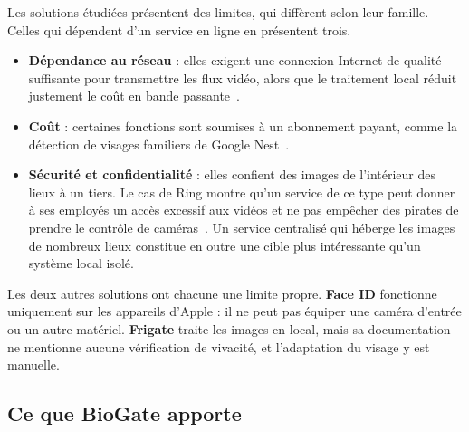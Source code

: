 \begin{maj}
Les solutions étudiées présentent des limites, qui diffèrent selon leur famille. Celles qui dépendent d'un service en ligne en présentent trois.
\end{maj}
\begin{itemize}
  \item \textbf{Dépendance au réseau} : elles exigent une connexion Internet de qualité suffisante pour transmettre les flux vidéo, alors que le traitement local réduit justement le coût en bande passante~\cite{shi2016edge}.
  \item \textbf{Coût} : certaines fonctions sont soumises à un abonnement payant, comme la détection de visages familiers de Google Nest~\cite{google2026familiarface}.
  \item \textbf{Sécurité et confidentialité} : elles confient des images de l'intérieur des lieux à un tiers. Le cas de Ring montre qu'un service de ce type peut donner à ses employés un accès excessif aux vidéos et ne pas empêcher des pirates de prendre le contrôle de caméras~\cite{ftc2023ring}. Un service centralisé qui héberge les images de nombreux lieux constitue en outre une cible plus intéressante qu'un système local isolé.
\end{itemize}
\begin{maj}
Les deux autres solutions ont chacune une limite propre. \textbf{Face ID} fonctionne uniquement sur les appareils d'Apple : il ne peut pas équiper une caméra d'entrée ou un autre matériel. \textbf{Frigate} traite les images en local, mais sa documentation ne mentionne aucune vérification de vivacité, et l'adaptation du visage y est manuelle.
\end{maj}

\subsection{Ce que BioGate apporte}

